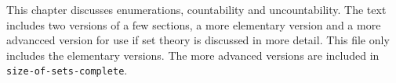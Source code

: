 \documentclass[../../../include/open-logic-chapter]{subfiles}
\begin{document}

\begin{editorial}
This chapter discusses enumerations, countability and uncountability.
The text includes two versions of a few sections, a more elementary
version and a more advancced version for use if set theory is
discussed in more detail. This file only includes the elementary
versions. The more advanced versions are included in \verb|size-of-sets-complete|.
\end{editorial}











\OLEndChapterHook
\end{document}
